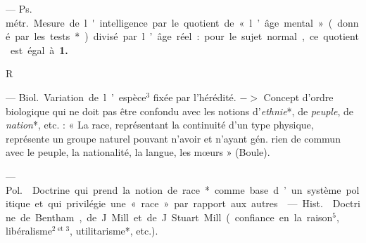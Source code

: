 \begin{itemize}[leftmargin=1cm, label=, itemsep=1pt]
 — \si{Ps. métr.} Mesure de l'intelligence par le
quotient de « l’âge mental » (donné par les tests*) divisé par l’âge réel :
pour le sujet normal, ce quotient est égal à {\bf 1.}

\begin{center}
\huge{R}
\end{center}

 — \si{Biol.} Variation de l’espèce$^3$ fixée par l’hérédité. $->$
Concept d'ordre biologique qui ne doit pas être confondu avec les notions
d’{\it ethnie}*, de {\it peuple}, de {\it nation}*, etc. : « La race,
représentant la continuité d'un type physique, représente un groupe naturel
pouvant n’avoir et n'ayant gén. rien de commun avec le peuple, la
nationalité, la langue, les mœurs » (Boule).

 — \si{Pol.}  Doctrine qui prend la notion de
race* comme base d’un système politique et qui privilégie une « race » par
rapport aux autres.

 — \si{Hist.}  Doctrine de
Bentham, de J. Mill et de J. Stuart Mill (confiance en la raison$^5$,
libéralisme$^\text{2 et 3}$, utilitarisme*, etc.).


\end{itemize}
